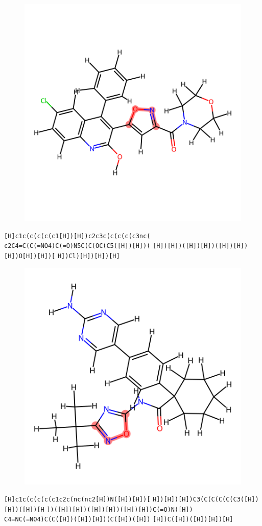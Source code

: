 \documentclass{article}
\begin{document}
\begin{figure}[ht]
\centering
    \includegraphics{mol154.png}
\end{figure}
\verb|[H]c1c(c(c(c(c1[H])[H])c2c3c(c(c(c(c3nc(| \verb|c2C4=C(C(=NO4)C(=O)N5C(C(OC(C5([H])[H])(| \verb|[H])[H])([H])[H])([H])[H])[H])O[H])[H])[| \verb|H])Cl)[H])[H])[H]|

\begin{figure}[ht]
\centering
    \includegraphics{mol155.png}
\end{figure}
\verb|[H]c1c(c(c(c(c1c2c(nc(nc2[H])N([H])[H])[| \verb|H])[H])[H])C3(C(C(C(C(C3([H])[H])([H])[H| \verb|])([H])[H])([H])[H])([H])[H])C(=O)N([H])| \verb|C4=NC(=NO4)C(C([H])([H])[H])(C([H])([H])| \verb|[H])C([H])([H])[H])[H]|
\end{document}
